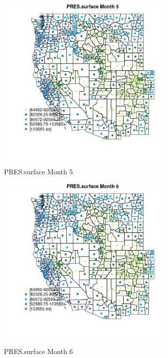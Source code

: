 \begin{figure} 
\centering  
\includegraphics[width=0.77\textwidth]{Code_Outputs/df_report_ML_predictors_CountyCentroid_Locations_Dates_2008-01-01to2018-12-31_MapObsMo5PRESsurface.jpg} 
\caption{\label{fig:df_report_ML_predictors_CountyCentroid_Locations_Dates_2008-01-01to2018-12-31MapObsMo5PRESsurface}PRES.surface Month 5} 
\end{figure} 
 

\begin{figure} 
\centering  
\includegraphics[width=0.77\textwidth]{Code_Outputs/df_report_ML_predictors_CountyCentroid_Locations_Dates_2008-01-01to2018-12-31_MapObsMo6PRESsurface.jpg} 
\caption{\label{fig:df_report_ML_predictors_CountyCentroid_Locations_Dates_2008-01-01to2018-12-31MapObsMo6PRESsurface}PRES.surface Month 6} 
\end{figure} 
 

